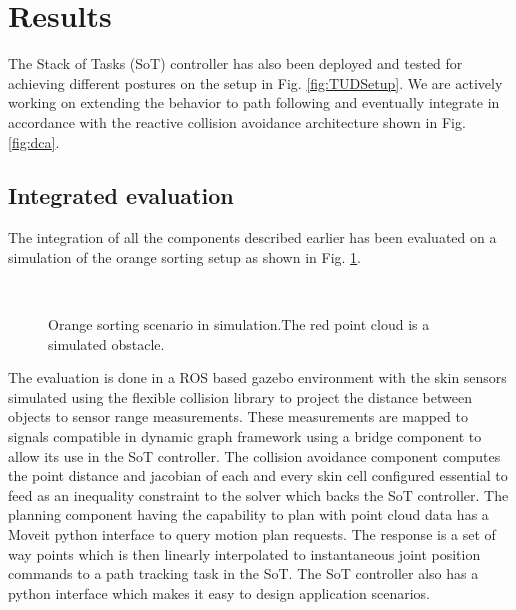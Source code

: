 
\section{Results}
The Stack of Tasks (SoT) controller has also been deployed and tested for achieving different postures on the setup in Fig. \ref{fig:TUDSetup}. We are actively working on extending the behavior to path following and eventually integrate in accordance with the reactive collision avoidance architecture shown in Fig. \ref{fig:dca}. 


\subsection{Integrated evaluation}
\hypersetup{colorlinks, linkcolor=blue}
The integration of all the components described earlier has been evaluated on a simulation of the orange sorting setup as shown in Fig. \ref{fig:TOMMSimulation}.

\begin{figure}[h]
\centering
{}\\[-10pt]
\caption[]{Orange sorting scenario in simulation.The red point cloud is a simulated obstacle.}
\label{fig:TOMMSimulation}
\end{figure}
The evaluation is done in a ROS based gazebo environment with the skin sensors simulated using the flexible collision library to project the distance between objects to sensor range measurements. 
These measurements are mapped to signals compatible in dynamic graph framework using a bridge component to allow its use in the SoT controller. The collision avoidance component computes the point 
distance and jacobian of each and every skin cell configured  essential to feed as an inequality constraint to the solver which backs the SoT controller. The planning component having the capability 
to plan with point cloud data has a Moveit python interface to query motion plan requests. The response is a set of way points which is then linearly interpolated to instantaneous joint position commands
to a path tracking task in the SoT. The SoT controller also has a python interface which makes it easy to design application scenarios.

